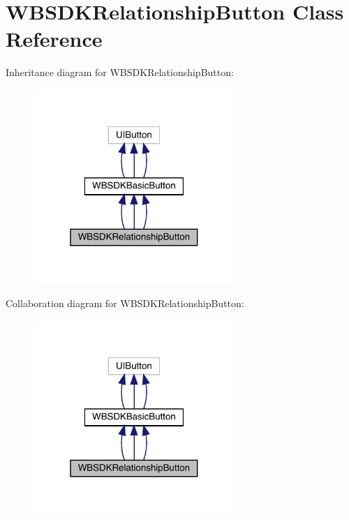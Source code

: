 \hypertarget{interface_w_b_s_d_k_relationship_button}{}\section{W\+B\+S\+D\+K\+Relationship\+Button Class Reference}
\label{interface_w_b_s_d_k_relationship_button}


Inheritance diagram for W\+B\+S\+D\+K\+Relationship\+Button\+:\nopagebreak
\begin{figure}[H]
\begin{center}
\leavevmode
\includegraphics[width=217pt]{interface_w_b_s_d_k_relationship_button__inherit__graph}
\end{center}
\end{figure}


Collaboration diagram for W\+B\+S\+D\+K\+Relationship\+Button\+:\nopagebreak
\begin{figure}[H]
\begin{center}
\leavevmode
\includegraphics[width=217pt]{interface_w_b_s_d_k_relationship_button__coll__graph}
\end{center}
\end{figure}
